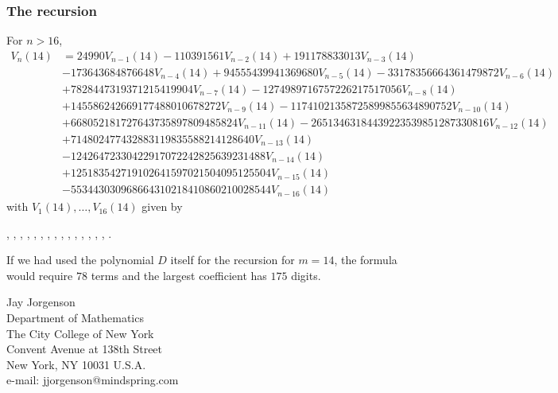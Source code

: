 \documentclass[11pt,reqno]{amsart}
\theoremstyle{remark}
\begin{document}
\subsubsection*{The recursion}
For $n>16$,
\begin{align*}
V_n(14) &=
24990V_{n-1}(14)
- 110391561V_{n-2}(14)
+ 191178833013V_{n-3}(14)
\\&- 173643684876648V_{n-4}(14)
+ 94555439941369680V_{n-5}(14)
- 33178356664361479872V_{n-6}(14)
\\&+ 7828447319371215419904V_{n-7}(14)
- 1274989716757226217517056V_{n-8}(14)
\\&+ 145586242669177488010678272V_{n-9}(14)
- 11741021358725899855634890752V_{n-10}(14)
\\&+ 668052181727643735897809485824V_{n-11}(14)
- 26513463184439223539851287330816V_{n-12}(14)
\\&+ 714802477432883119835588214128640V_{n-13}(14)
\\&- 12426472330422917072242825639231488V_{n-14}(14)
\\&+ 125183542719102641597021504095125504V_{n-15}(14)
\\&- 553443030968664310218410860210028544V_{n-16}(14)
\end{align*}
with $V_1(14),\ldots,V_{16}(14)$ given by
\medskip

\noindent
{}, , , , , , , , , , , , , , , .

If we had used the polynomial $D$ itself for the recursion for $m=14$, the formula would require $78$ terms and the largest coefficient
has $175$ digits.


\vspace{5mm}
\noindent
Jay Jorgenson \\
 Department of Mathematics \\
 The City College of New York \\
 Convent Avenue at 138th Street \\
 New York, NY 10031 U.S.A. \\
 e-mail: jjorgenson@mindspring.com
\end{document}
